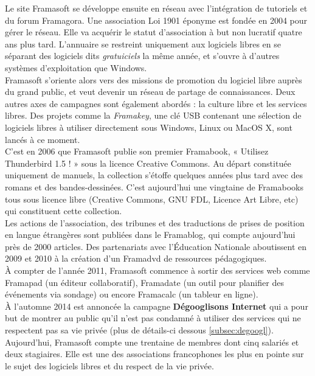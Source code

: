 \documentclass[10pt,a4paper, twoside]{report}
\begin{document}
	Le site Framasoft se développe ensuite en réseau avec l'intégration de tutoriels et du forum Framagora. Une association Loi 1901 éponyme est fondée en 2004 pour gérer le réseau. Elle va acquérir le statut d'association à but non lucratif quatre ans plus tard. L'annuaire se restreint uniquement aux logiciels libres en se séparant des logiciels dits \textit{gratuiciels} la même année, et s'ouvre à d'autres systèmes d'exploitation que Windows.
	\\
	
	Framasoft s'oriente alors vers des missions de promotion du logiciel libre auprès du grand public, et veut devenir un réseau de partage de connaissances. Deux autres axes de campagnes sont également abordés : la culture libre et les services libres. Des projets comme la \textit{Framakey}, une clé USB contenant une sélection de logiciels libres à utiliser directement sous Windows, Linux ou MacOS X, sont lancés à ce moment.
	\\
	
	C'est en 2006 que Framasoft publie son premier Framabook, « Utilisez Thunderbird 1.5 ! » sous la licence Creative Commons. Au départ constituée uniquement de manuels, la collection s'étoffe quelques années plus tard avec des romans et des bandes-dessinées. C'est aujourd'hui une vingtaine de Framabooks tous sous licence libre (Creative Commons, GNU FDL, Licence Art Libre, etc) qui constituent cette collection.
	\\
	
	Les actions de l'association, des tribunes et des traductions de prises de position en langue étrangères sont publiées dans le Framablog, qui compte aujourd'hui près de 2000 articles. Des partenariats avec l'Éducation Nationale aboutissent en 2009 et 2010 à la création d'un Framadvd de ressources pédagogiques.
	\\
	
	À compter de l'année 2011, Framasoft commence à sortir des services web comme Framapad (un éditeur collaboratif), Framadate (un outil pour planifier des événements via sondage) ou encore Framacalc (un tableur en ligne).
	\\
	
	À l'automne 2014 est annoncée la campagne \textbf{Dégooglisons Internet} qui a pour but de montrer au public qu'il n'est pas condamné à utiliser des services qui ne respectent pas sa vie privée (plus de détails-ci dessous \ref{subsec:degoogl}).
	\\
	
	Aujourd'hui, Framasoft compte une trentaine de membres dont cinq salariés et deux stagiaires. Elle est une des associations francophones les plus en pointe sur le sujet des logiciels libres et du respect de la vie privée.
	\\
	
\end{document}
